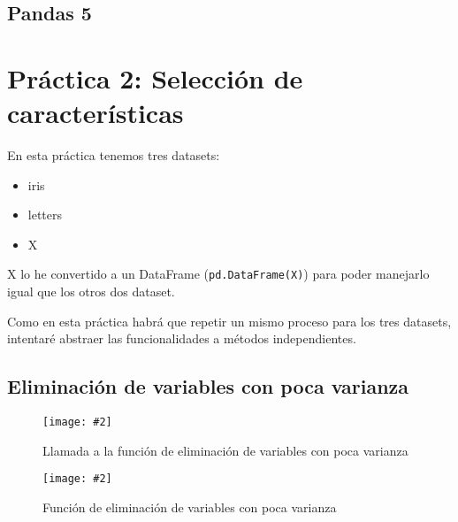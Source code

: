 \documentclass[
12pt, 
spanish, 
singlespacing,
headsepline
]{article}
\newcommand{\image}[2]{
\begin{figure}[H]
	\caption{#1}
	\centering
	\texttt{[image: \#2]}
\end{figure}
}
\newcommand{\code}[1]{\colorbox{light-gray}{\texttt{#1}}}
\begin{document}
\subsection{Pandas 5}

\section{Práctica 2: Selección de características}
En esta práctica tenemos tres datasets:
\begin{itemize}
\item iris
\item letters
\item X
\end{itemize}

X lo he convertido a un DataFrame (\code{pd.DataFrame(X)}) para poder manejarlo igual que los otros dos dataset.

Como en esta práctica habrá que repetir un mismo proceso para los tres datasets, intentaré abstraer las funcionalidades a métodos independientes.

\subsection{Eliminación de variables con poca varianza}
\image{Llamada a la función de eliminación de variables con poca varianza}{Figure_7.png}
\image{Función de eliminación de variables con poca varianza}{Figure_7.1.png}
\end{document}
